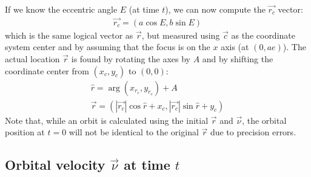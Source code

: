 \begin{appendices}
\noindent
If we know the eccentric angle $E$ (at time $t$), we can now compute the $\vec{r_c}$ vector: 
\begin{eqnarray*}
\vec{r_c} = (a\cos{E}, b\sin{E})
\end{eqnarray*}
which is the same logical vector as $\vec{r}$, but measured using $\vec{c}$ as the coordinate system center and by assuming that the focus is on the $x$ axis (at $(0,ae)$). The actual location $\vec{r}$ is found by rotating the axes by $A$ and by shifting the coordinate center from $(x_c,y_c)$ to $(0,0)$:
\begin{eqnarray*}
\hat{r} = \arg(x_{r_c},y_{r_c}) + A\\
\vec{r} = (|\vec{r_c}|\cos{\hat{r}}+x_c,|\vec{r_c}|\sin{\hat{r}}+y_c)
\end{eqnarray*}
Note that, while an orbit is calculated using the initial $\vec{r}$ and $\vec{\nu}$, the orbital position at $t = 0$ will not be identical to the original $\vec{r}$ due to precision errors.

\subsection{Orbital velocity \texorpdfstring{$\vec{\nu}$}{v} at time \texorpdfstring{$t$}{t}}


\end{appendices}
